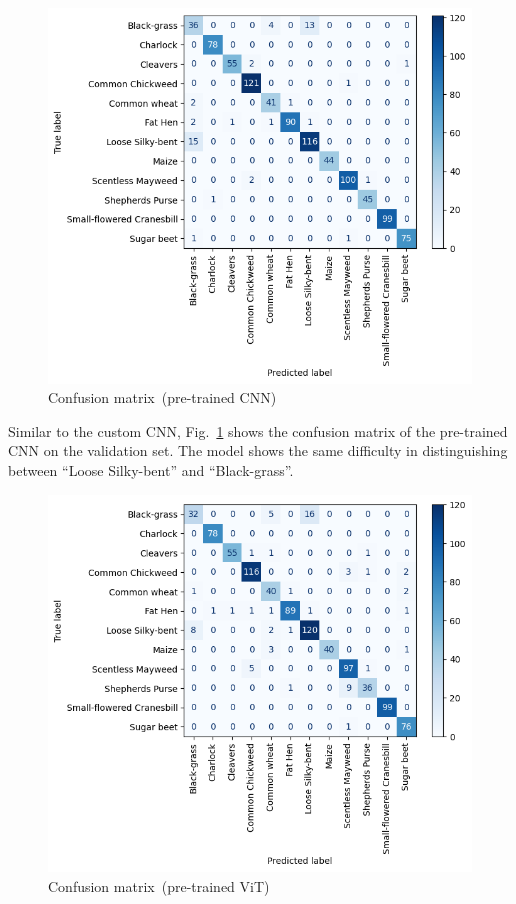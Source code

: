 \begin{figure}[htbp]
    \centerline{\includegraphics[width=0.9\linewidth]{../../resources/resnet/confusion.png}}
    \caption{Confusion matrix~(pre-trained CNN)}
    \label{fig:confusion-matrix-pretrained-cnn}
\end{figure}

Similar to the custom CNN, Fig.~\ref{fig:confusion-matrix-pretrained-cnn} shows the confusion matrix of the pre-trained CNN on the validation set. The model shows the same difficulty in distinguishing between ``Loose Silky-bent'' and ``Black-grass''.

\begin{figure}[htbp]
    \centerline{\includegraphics[width=0.9\linewidth]{../../resources/vit/confusion.png}}
    \caption{Confusion matrix~(pre-trained ViT)}
    \label{fig:confusion-matrix-pretrained-vit}
\end{figure}

